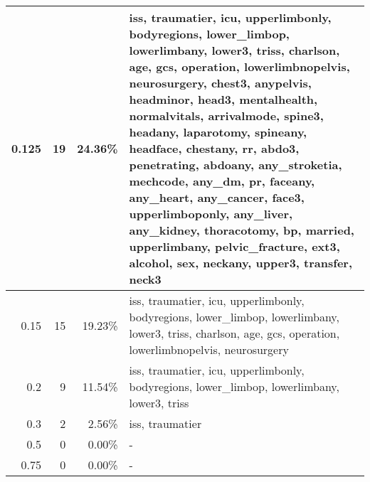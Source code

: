 \begin{table}[htbp]
{\begin{tabular}{|r|r|r|p{11cm}|}
0.125 & 19 & 24.36\% & iss, traumatier, icu, upperlimbonly, bodyregions, lower\_limbop, lowerlimbany, lower3, triss, charlson, age, gcs, operation, lowerlimbnopelvis, neurosurgery, chest3, anypelvis, headminor, head3, mentalhealth, normalvitals, arrivalmode, spine3, headany, laparotomy, spineany, headface, chestany, rr, abdo3, penetrating, abdoany, any\_stroketia, mechcode, any\_dm, pr, faceany, any\_heart, any\_cancer, face3, upperlimboponly, any\_liver, any\_kidney, thoracotomy, bp, married, upperlimbany, pelvic\_fracture, ext3, alcohol, sex, neckany, upper3, transfer, neck3 \\ \hline
0.15 & 15 & 19.23\% & iss, traumatier, icu, upperlimbonly, bodyregions, lower\_limbop, lowerlimbany, lower3, triss, charlson, age, gcs, operation, lowerlimbnopelvis, neurosurgery \\ \hline
0.2 & 9 & 11.54\% & iss, traumatier, icu, upperlimbonly, bodyregions, lower\_limbop, lowerlimbany, lower3, triss \\ \hline
0.3 & 2 & 2.56\% & iss, traumatier \\ \hline
0.5 & 0 & 0.00\% & - \\ \hline
0.75 & 0 & 0.00\% & - \\ \hline
\end{tabular}}
\end{table}
